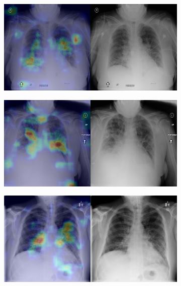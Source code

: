 \begin{figure}[b]
\begin{subfigure}{0.4\textwidth}
    \end{subfigure}
    \begin{subfigure}{0.4\textwidth}
        \centering
        \includegraphics[width=1.0\textwidth]{Chapters/5. Conclusiones/img/Edema/1_1_00006304_002.png}
    \end{subfigure}
    \begin{subfigure}{0.4\textwidth}
        \centering
        \includegraphics[width=1.0\textwidth]{Chapters/5. Conclusiones/img/Edema/1_1_00006304_006.png}
    \end{subfigure}
    \begin{subfigure}{0.4\textwidth}
        \centering
        \includegraphics[width=1.0\textwidth]{Chapters/5. Conclusiones/img/Edema/1_1_00010535_002.png}

\end{subfigure}
\end{figure}
